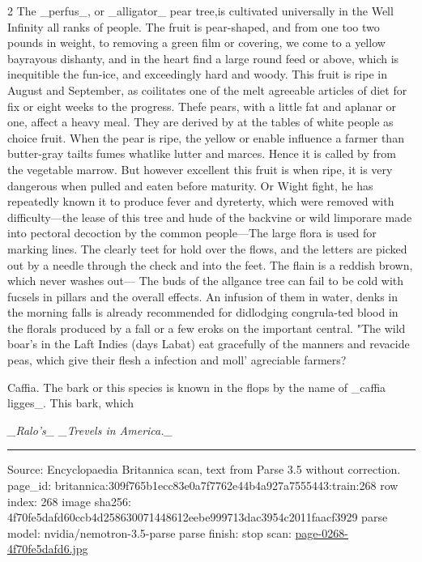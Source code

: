 \documentclass[10pt]{article}
\begin{document}
\begin{multicols}{2}
The \_perfus\_, or \_alligator\_ pear tree,is cultivated universally in the Well Infinity all ranks of people. The fruit is pear-shaped, and from one too two pounds in weight, to removing a green film or covering, we come to a yellow bayrayous dishanty, and in the heart find a large round feed or above, which is inequitible the fun-ice, and exceedingly hard and woody. This fruit is ripe in August and September, as coilitates one of the melt agreeable articles of diet for fix or eight weeks to the progress. Thefe pears, with a little fat and aplanar or one, affect a heavy meal. They are derived by at the tables of white people as choice fruit. When the pear is ripe, the yellow or enable influence a farmer than butter-gray tailts fumes whatlike lutter and marces. Hence it is called by from the vegetable marrow. But however excellent this fruit is when ripe, it is very dangerous when pulled and eaten before maturity. Or Wight fight, he has repeatedly known it to produce fever and dyreterty, which were removed with difficulty—the lease of this tree and hude of the backvine or wild limporare made into pectoral decoction by the common people—The large flora is used for marking lines. The clearly teet for hold over the flows, and the letters are picked out by a needle through the check and into the feet. The flain is a reddish brown, which never washes out— The buds of the allgance tree can fail to be cold with fucsels in pillars and the overall effects. An infusion of them in water, denks in the morning falls is already recommended for didlodging congrula-ted blood in the florals produced by a fall or a few eroks on the important central. "The wild boar's in the Laft Indies (days Labat) eat gracefully of the manners and revacide peas, which give their flesh a infection and moll' agreciable farmers?

Caffia. The bark or this species is known in the flops by the name of \_caffia ligges\_. This bark, which

\begin{center}\small\itshape \_Ralo’s\_ \_Trevels in America.\_\end{center}
\end{multicols}
\vfill\par\noindent\rule{\linewidth}{0.4pt}\par
{\scriptsize\color{gray}\noindent Source: Encyclopaedia Britannica scan, text from Parse 3.5 without correction. page\_id: britannica:309f765b1ecc83e0a7f7762e44b4a927a7555443:train:268 \quad row index: 268 \quad image sha256: 4f70fe5dafd60ccb4d258630071448612eebe999713dac3954c2011faacf3929 \quad parse model: nvidia/nemotron-3.5-parse \quad parse finish: stop \quad scan: \href{../scans/page-0268-4f70fe5dafd6.jpg}{page-0268-4f70fe5dafd6.jpg}\par}
\end{document}
